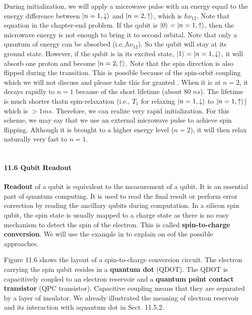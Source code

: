 \documentclass{article}
\begin{document}
During initialization, we will apply a microwave pulse with an energy equal to
the energy difference between $\ket{n=1,\downarrow}$ and $\ket{n=2,\uparrow}$, which is $\hbar \nu_{12}$.
Note that equation in the chapter-end problem. If the qubit is $\ket{0}
=\ket{n=1,\uparrow}$, then the microwave energy is not enough to bring it to 
second orbital. Note that only a quantum of energy can be absorbed (i.e.,$\hbar \nu_{12}$).
So the qubit will stay at its ground state. However, if the qubit is in its excited state, $\ket{1}=\ket{n=1,\downarrow}$,
it will absorb one proton and become $\ket{n=2,\uparrow}$. Note that the spin direction is also flipped 
during the transition. This is possible because of the spin-orbit coupling which we will not
discuss and please take this for granted \cite{9friesen2004spin}. When it is at $n=2$, it decays rapidly to $n=1$ because of the
short lifetime (about 80 $ns$). The lifetime is much shorter thatn spin-relaxation (i.e., $T_1$ for relaxing
$\ket{n=1,\downarrow}$ to $\ket{n=1,\uparrow}$) which is $>1 ms$. Therefore, we can realize very rapid initialization.
For this scheme, we may say that we use an external microwave pulse to achieve spin flipping. Although
it is brought to a higher energy level ($n=2$), it will then relax naturally very fast to $n=1$.\\\\\\
\textbf{\large 11.6 Qubit Readout}\\\\
\textbf{Readout} of a qubit is equivalent to the measurement of a qubit. It is an essential part of
quantum computing. It is used to read the final result or perform error correction by reading the ancillary qubits
during computation. In a silicon spin qubit, the spin state is usually mapped to a charge state as there is no easy
mechanism to detect the spin of the electron. This is called \textbf{spin-to-charge conversion}. We will use the
example in \cite{8elzerman2004single} to explain on eof the possible approaches.

Figure 11.6 shows the layout of a spin-to-charge conversion circuit. The electron carrying the spin qubit resides in a
\textbf{quantum dot} (QDOT). The QDOT is capacitively coupled to an electron reservoir and a \textbf{quantum point contact transistor}
(QPC transistor). Capacitive coupling means that they are separated by a layer of insulator. We already illustrated the meaning of electron
reservoir and its interaction with aquantum dot in Sect. 11.5.2.
\end{document}

